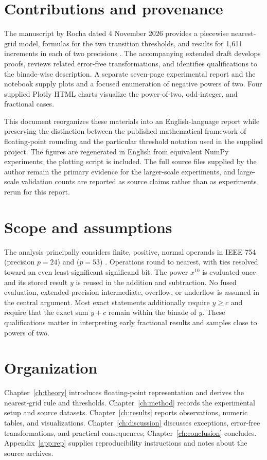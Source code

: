 \section{Contributions and provenance}\label{sec:provenance}
The manuscript by Rocha dated 4 November 2026 provides a piecewise nearest-grid model, formulas for the two transition thresholds, and results for 1,611 increments in each of two precisions \cite{rocha2026manuscript}. The accompanying extended draft develops proofs, reviews related error-free transformations, and identifies qualifications to the binade-wise description. A separate seven-page experimental report and the  notebook supply plots and a focused enumeration of negative powers of two. Four supplied Plotly HTML charts visualize the power-of-two, odd-integer, and fractional cases.

This document reorganizes these materials into an English-language report while preserving the distinction between the published mathematical framework of floating-point rounding and the particular threshold notation used in the supplied project. The figures are regenerated in English from equivalent NumPy experiments; the plotting script is included. The full source files supplied by the author remain the primary evidence for the larger-scale experiments, and large-scale validation counts are reported as source claims rather than as experiments rerun for this report.

\section{Scope and assumptions}
The analysis principally considers finite, positive, normal operands in IEEE 754  (precision $p=24$) and  ($p=53$) \cite{ieee7542019}. Operations round to nearest, with ties resolved toward an even least-significant significand bit. The power $x^{10}$ is evaluated once and its stored result $y$ is reused in the addition and subtraction. No fused evaluation, extended-precision intermediate, overflow, or underflow is assumed in the central argument. Most exact statements additionally require $y\ge c$ and require that the exact sum $y+c$ remain within the binade of $y$. These qualifications matter in interpreting early fractional results and samples close to powers of two.

\section{Organization}
Chapter~\ref{ch:theory} introduces floating-point representation and derives the nearest-grid rule and thresholds. Chapter~\ref{ch:method} records the experimental setup and source datasets. Chapter~\ref{ch:results} reports observations, numeric tables, and visualizations. Chapter~\ref{ch:discussion} discusses exceptions, error-free transformations, and practical consequences; Chapter~\ref{ch:conclusion} concludes. Appendix~\ref{app:rep} supplies reproducibility instructions and notes about the source archives.
